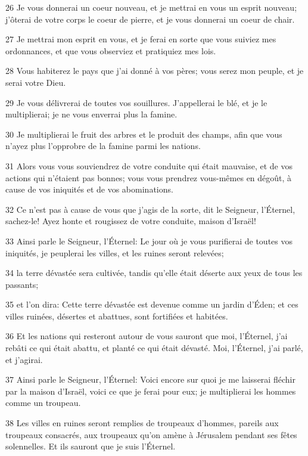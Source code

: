 \par 26 Je vous donnerai un coeur nouveau, et je mettrai en vous un esprit nouveau; j'ôterai de votre corps le coeur de pierre, et je vous donnerai un coeur de chair.
\par 27 Je mettrai mon esprit en vous, et je ferai en sorte que vous suiviez mes ordonnances, et que vous observiez et pratiquiez mes lois.
\par 28 Vous habiterez le pays que j'ai donné à vos pères; vous serez mon peuple, et je serai votre Dieu.
\par 29 Je vous délivrerai de toutes vos souillures. J'appellerai le blé, et je le multiplierai; je ne vous enverrai plus la famine.
\par 30 Je multiplierai le fruit des arbres et le produit des champs, afin que vous n'ayez plus l'opprobre de la famine parmi les nations.
\par 31 Alors vous vous souviendrez de votre conduite qui était mauvaise, et de vos actions qui n'étaient pas bonnes; vous vous prendrez vous-mêmes en dégoût, à cause de vos iniquités et de vos abominations.
\par 32 Ce n'est pas à cause de vous que j'agis de la sorte, dit le Seigneur, l'Éternel, sachez-le! Ayez honte et rougissez de votre conduite, maison d'Israël!
\par 33 Ainsi parle le Seigneur, l'Éternel: Le jour où je vous purifierai de toutes vos iniquités, je peuplerai les villes, et les ruines seront relevées;
\par 34 la terre dévastée sera cultivée, tandis qu'elle était déserte aux yeux de tous les passants;
\par 35 et l'on dira: Cette terre dévastée est devenue comme un jardin d'Éden; et ces villes ruinées, désertes et abattues, sont fortifiées et habitées.
\par 36 Et les nations qui resteront autour de vous sauront que moi, l'Éternel, j'ai rebâti ce qui était abattu, et planté ce qui était dévasté. Moi, l'Éternel, j'ai parlé, et j'agirai.
\par 37 Ainsi parle le Seigneur, l'Éternel: Voici encore sur quoi je me laisserai fléchir par la maison d'Israël, voici ce que je ferai pour eux; je multiplierai les hommes comme un troupeau.
\par 38 Les villes en ruines seront remplies de troupeaux d'hommes, pareils aux troupeaux consacrés, aux troupeaux qu'on amène à Jérusalem pendant ses fêtes solennelles. Et ils sauront que je suis l'Éternel.

